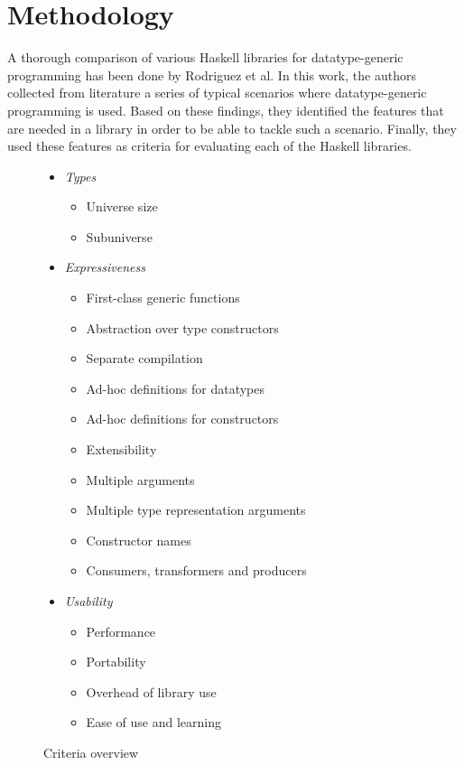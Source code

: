 \documentclass{article}
\begin{document}
\section{Methodology}

A thorough comparison of various Haskell libraries for datatype-generic programming has been done by Rodriguez et al\cite{rodriguez2008comparing}. In this work, the authors collected from literature a series of typical scenarios where datatype-generic programming is used. Based on these findings, they identified the features that are needed in a library in order to be able to tackle such a scenario. Finally, they used these features as criteria for evaluating each of the Haskell libraries.

\renewcommand{\labelitemii}{$\bullet$}
\begin{figure}
\begin{multicols}{3}
\label{lab:criteria}
\begin{itemize}
\item[] \textit{Types}
\begin{itemize}
\item Universe size
\item Subuniverse
\end{itemize}
\item[] \textit{Expressiveness}
\begin{itemize}
\item First-class generic functions
\item Abstraction over type constructors
\item Separate compilation
\item Ad-hoc definitions for datatypes
\item Ad-hoc definitions for constructors
\item Extensibility
\item Multiple arguments
\item Multiple type representation arguments
\item Constructor names
\item Consumers, transformers and producers
\end{itemize}
\item[] \textit{Usability}
\begin{itemize}
\item Performance
\item Portability
\item Overhead of library use
\item Ease of use and learning
\end{itemize}
\end{itemize}
\end{multicols}
\caption{Criteria overview}
\end{figure}
\end{document}
